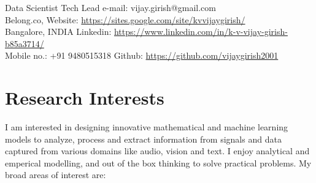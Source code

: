 \documentclass[line]{resume}
\begin{document}
	\small{
		\begin{resume}
			\setcounter{page}{1}
			\vspace{-4.5mm}
			\vspace{1mm}
		 Data Scientist Tech Lead          					\hfill e-mail: vijay.girish@gmail.com \\
			Belong.co,   \hfill Website: \url{https://sites.google.com/site/kvvijaygirish/}\\
		   Bangalore, INDIA  \hfill Linkedin: \url{https://www.linkedin.com/in/k-v-vijay-girish-b85a3714/}         \\			
		 \hspace{5cm}  Mobile no.: +91 9480515318 \hfill Github: \url{https://github.com/vijaygirish2001}
			\section{\mysidestyle Research Interests}
			\vspace{1mm}
			I am  interested in designing innovative mathematical and machine learning models to analyze, process and extract  information from signals and data  captured from various domains like audio, vision and text. I enjoy analytical and emperical modelling, and  out of the box thinking to solve practical problems. 
			My broad areas of interest are:\vspace{-.1cm}
			

\end{resume}}
\end{document}
